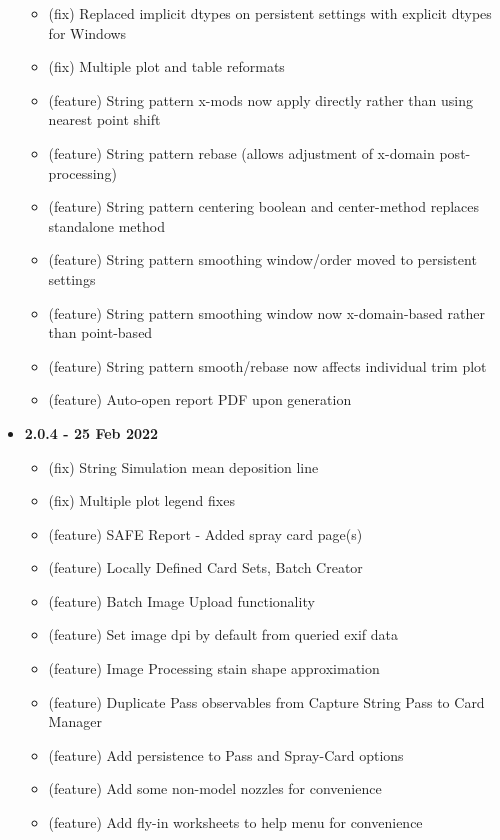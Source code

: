 \documentclass[10pt,letterpaper,titlepage]{article}
\begin{document}
\begin{itemize}
        \begin{itemize}
            \item (fix) Replaced implicit dtypes on persistent settings with explicit dtypes for Windows
            \item (fix) Multiple plot and table reformats 
            \item (feature) String pattern x-mods now apply directly rather than using nearest point shift
            \item (feature) String pattern rebase (allows adjustment of x-domain post-processing)
            \item (feature) String pattern centering boolean and center-method replaces standalone method
            \item (feature) String pattern smoothing window/order moved to persistent settings
            \item (feature) String pattern smoothing window now x-domain-based rather than point-based 
            \item (feature) String pattern smooth/rebase now affects individual trim plot
            \item (feature) Auto-open report PDF upon generation
        \end{itemize}
        \item \textbf{2.0.4 - 25 Feb 2022}
        \begin{itemize}
            \item (fix) String Simulation mean deposition line
            \item (fix) Multiple plot legend fixes
            \item (feature) SAFE Report - Added spray card page(s)
            \item (feature) Locally Defined Card Sets, Batch Creator
            \item (feature) Batch Image Upload functionality
            \item (feature) Set image dpi by default from queried exif data
            \item (feature) Image Processing stain shape approximation
            \item (feature) Duplicate Pass observables from Capture String Pass to Card Manager
            \item (feature) Add persistence to Pass and Spray-Card options
            \item (feature) Add some non-model nozzles for convenience
            \item (feature) Add fly-in worksheets to help menu for convenience

\end{itemize}
\end{itemize}
\end{document}
